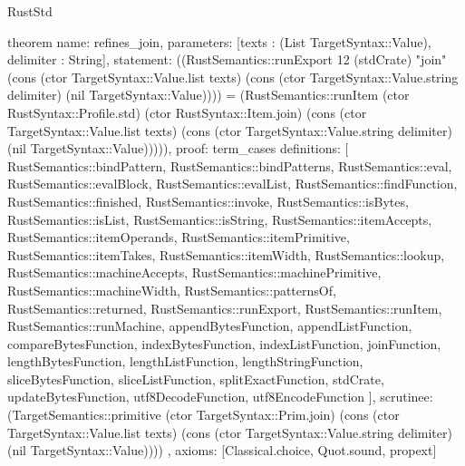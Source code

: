 \begin{lexlean}{RustStd}
\begin{semanticmodule}
theorem{
  name: refines_join,
  parameters: [texts : (List TargetSyntax::Value), delimiter : String],
  statement: ((RustSemantics::runExport 12 (stdCrate) "join" (cons (ctor TargetSyntax::Value.list texts) (cons (ctor TargetSyntax::Value.string delimiter) (nil TargetSyntax::Value)))) = (RustSemantics::runItem (ctor RustSyntax::Profile.std) (ctor RustSyntax::Item.join) (cons (ctor TargetSyntax::Value.list texts) (cons (ctor TargetSyntax::Value.string delimiter) (nil TargetSyntax::Value))))),
  proof: term_cases{
    definitions: [
      RustSemantics::bindPattern,
      RustSemantics::bindPatterns,
      RustSemantics::eval,
      RustSemantics::evalBlock,
      RustSemantics::evalList,
      RustSemantics::findFunction,
      RustSemantics::finished,
      RustSemantics::invoke,
      RustSemantics::isBytes,
      RustSemantics::isList,
      RustSemantics::isString,
      RustSemantics::itemAccepts,
      RustSemantics::itemOperands,
      RustSemantics::itemPrimitive,
      RustSemantics::itemTakes,
      RustSemantics::itemWidth,
      RustSemantics::lookup,
      RustSemantics::machineAccepts,
      RustSemantics::machinePrimitive,
      RustSemantics::machineWidth,
      RustSemantics::patternsOf,
      RustSemantics::returned,
      RustSemantics::runExport,
      RustSemantics::runItem,
      RustSemantics::runMachine,
      appendBytesFunction,
      appendListFunction,
      compareBytesFunction,
      indexBytesFunction,
      indexListFunction,
      joinFunction,
      lengthBytesFunction,
      lengthListFunction,
      lengthStringFunction,
      sliceBytesFunction,
      sliceListFunction,
      splitExactFunction,
      stdCrate,
      updateBytesFunction,
      utf8DecodeFunction,
      utf8EncodeFunction
    ],
    scrutinee: (TargetSemantics::primitive (ctor TargetSyntax::Prim.join) (cons (ctor TargetSyntax::Value.list texts) (cons (ctor TargetSyntax::Value.string delimiter) (nil TargetSyntax::Value))))
  },
  axioms: [Classical.choice, Quot.sound, propext]
}


\end{semanticmodule}
\end{lexlean}
